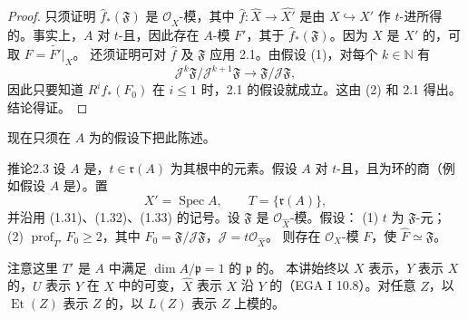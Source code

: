 \begin{proof}
只须证明 $\widehat f_*(\mathfrak F)$ 是 $\mathcal O_{\widehat X}$-模，其中 $\widehat f:\widehat X\to\widehat{X'}$ 是由 $X\hookrightarrow X'$ 作 $t$-进所得的。事实上，$A$ 对 $t$-且，因此存在 $A$-模 $F'$，其于 $\widehat f_*(\mathfrak F)$。因为 $X$ 是 $X'$ 的，可取 $F=\widetilde{F'}|_X$。
还须证明可对 $\widehat f$ 及 $\mathfrak F$ 应用 2.1。由假设 (1)，对每个 $k\in\mathbb N$ 有
\[\mathcal J^k\mathfrak F/\mathcal J^{k+1}\mathfrak F\longrightarrow\mathfrak F/\mathcal J\mathfrak F,\]
因此只要知道 $R^if_*(F_0)$ 在 $i\leq1$ 时，2.1 的假设就成立。这由 (2) 和 2.1 得出。结论得证。
\end{proof}
现在只须在 $A$ 为的假设下把此陈述。
\begin{SGAresult}{推论}{2.3}
设 $A$ 是，$t\in\mathfrak r(A)$ 为其根中的元素。假设 $A$ 对 $t$-且，且为环的商（例如假设 $A$ 是）。置
\[X'=\operatorname{Spec}A,\qquad T=\{\mathfrak r(A)\},\tag{2.9}\]
并沿用 (1.31)、(1.32)、(1.33) 的记号。设 $\mathfrak F$ 是 $\mathcal O_{\widehat X}$-模。假设：
(1) $t$ 为 $\mathfrak F$-元；
(2) $\operatorname{prof}_{T'}F_0\geq2$，其中 $F_0=\mathfrak F/\mathcal J\mathfrak F$，$\mathcal J=t\mathcal O_{\widehat X}$。
则存在 $\mathcal O_X$-模 $F$，使 $\widehat F\simeq\mathfrak F$。
\end{SGAresult}
注意这里 $T'$ 是 $A$ 中满足 $\dim A/\mathfrak p=1$ 的 $\mathfrak p$ 的。
本讲始终以 $X$ 表示，$Y$ 表示 $X$ 的，$U$ 表示 $Y$ 在 $X$ 中的可变，$\widehat X$ 表示 $X$ 沿 $Y$ 的（EGA I 10.8）。对任意 $Z$，以 $\operatorname{Et}(Z)$ 表示 $Z$ 的，以 $L(Z)$ 表示 $Z$ 上模的。
